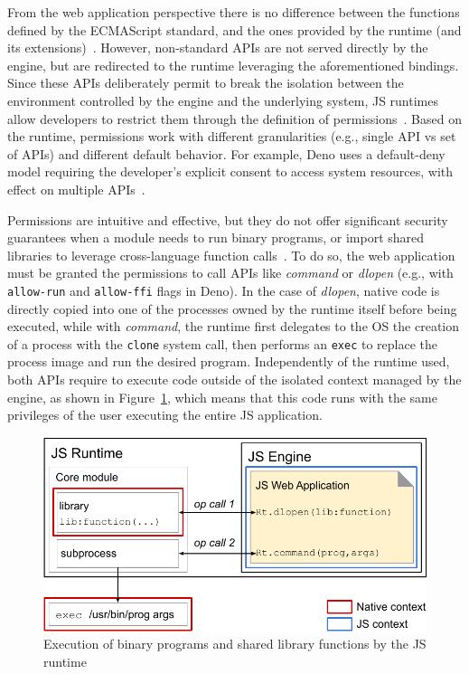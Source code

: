 From the web application perspective there is no difference between
the functions defined by the ECMAScript standard, and the ones
provided by the runtime (and its
extensions)~\cite{brown2017finding,dinh2021favocado}.  However,
non-standard APIs are not served directly by the engine, but are
redirected to the runtime leveraging the aforementioned
bindings. Since these APIs deliberately permit to break the isolation
between the environment controlled by the engine and the underlying
system, JS runtimes allow developers to restrict them through the
definition of permissions~\cite{node-permissions,
  deno-permissions}. Based on the runtime, permissions work with
different granularities (e.g., single API vs set of APIs) and
different default behavior. For example, Deno uses a default-deny
model requiring the developer's explicit consent to access
system resources, with effect on multiple
APIs~\cite{deno-permissions}.

Permissions are intuitive and effective, but they do not offer
significant security guarantees when a module needs to run binary
programs, or import shared libraries to leverage cross-language
function calls~\cite{deno-permissions}. To do so, the web application
must be granted the permissions to call APIs like {\em command} or
{\em dlopen} (e.g., with {\tt allow-run} and {\tt allow-ffi}
flags in Deno). In the case of {\em dlopen}, native code is directly
copied into one of the processes owned by the runtime itself before
being executed, while with {\em command}, the runtime first delegates
to the OS the creation of a process with the {\tt clone} system call,
then performs an {\tt exec} to replace the process image and run the
desired program.  Independently of the runtime used, both APIs require
to execute code outside of the isolated context managed by the engine,
as shown in Figure~\ref{fig:js_runtime}, which means that this code
runs with the same privileges of the user executing the entire JS
application.

\begin{figure}[t]
  \includegraphics[width=\columnwidth]{chapters/natisand/fig/js_runtime}
  \caption[Execution of binary programs and shared libraries by JS
    runtimes]{
    Execution of binary programs and shared library functions by the
    JS runtime
  }
  \label{fig:js_runtime}
\end{figure}


